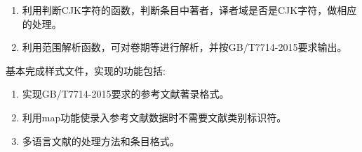 \begin{enumerate}
\item 利用判断CJK字符的函数，判断条目中著者，译者域是否是CJK字符，做相应的处理。

\item 利用范围解析函数，可对卷期等进行解析，并按GB/T7714-2015要求输出。
\end{enumerate}

基本完成样式文件，实现的功能包括:
\begin{enumerate}
\item 实现GB/T7714-2015要求的参考文献著录格式。

\item 利用map功能使录入参考文献数据时不需要文献类别标识符。

\item 多语言文献的处理方法和条目格式。
\end{enumerate}






